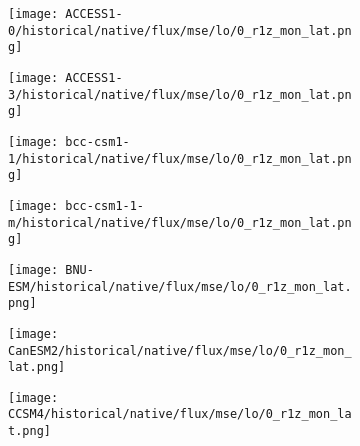 \documentclass[preview]{standalone}
\begin{document}
\begin{figure}
  \begin{subfigure}[t]{\textwidth}
    \texttt{[image: ACCESS1-0/historical/native/flux/mse/lo/0\_r1z\_mon\_lat.png]}
  \end{subfigure}
\end{figure}

\begin{figure}
  \begin{subfigure}[t]{\textwidth}
    \texttt{[image: ACCESS1-3/historical/native/flux/mse/lo/0\_r1z\_mon\_lat.png]}
  \end{subfigure}
\end{figure}

\begin{figure}
  \begin{subfigure}[t]{\textwidth}
    \texttt{[image: bcc-csm1-1/historical/native/flux/mse/lo/0\_r1z\_mon\_lat.png]}
  \end{subfigure}
\end{figure}

\begin{figure}
  \begin{subfigure}[t]{\textwidth}
    \texttt{[image: bcc-csm1-1-m/historical/native/flux/mse/lo/0\_r1z\_mon\_lat.png]}
  \end{subfigure}
\end{figure}

\begin{figure}
  \begin{subfigure}[t]{\textwidth}
    \texttt{[image: BNU-ESM/historical/native/flux/mse/lo/0\_r1z\_mon\_lat.png]}
  \end{subfigure}
\end{figure}

\begin{figure}
  \begin{subfigure}[t]{\textwidth}
    \texttt{[image: CanESM2/historical/native/flux/mse/lo/0\_r1z\_mon\_lat.png]}
  \end{subfigure}
\end{figure}

\begin{figure}
  \begin{subfigure}[t]{\textwidth}
    \texttt{[image: CCSM4/historical/native/flux/mse/lo/0\_r1z\_mon\_lat.png]}
  \end{subfigure}
\end{figure}
\end{document}
